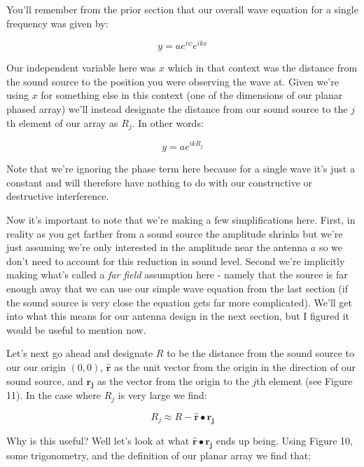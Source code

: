 \documentclass[10pt,a4paper]{article}
\begin{document}
You'll remember from the prior section that our overall wave equation for a single frequency was given by:

\begin{equation}
y = a e^{i\psi}e^{ikx}
\end{equation}

Our independent variable here was $x$ which in that context was the distance from the sound source to the position you were observing the wave at. Given we're using $x$ for something else in this context (one of the dimensions of our planar phased array) we'll instead designate the distance from our sound source to the $j$th element of our array as $R_j$. In other words:


\begin{equation}
y = a e^{ikR_j}
\end{equation}

Note that we're ignoring the phase term here because for a single wave it's just a constant and will therefore have nothing to do with our constructive or destructive interference. 

Now it's important to note that we're making a  few simplifications here. First, in reality as you get farther from a sound source the amplitude shrinks but we're just assuming we're only interested in the amplitude near the antenna $a$ so we don't need to account for this reduction in sound level. Second we're implicitly making what's called a \textit{far field} assumption here - namely that the source is far enough away that we can use our simple wave equation from the last section (if the sound source is very close the equation gets far more complicated). We'll get into what this means for our antenna design in the next section, but I figured it would be useful to mention now. 

Let's next go ahead and designate $R$ to be the distance from the sound source to our our origin $(0,0)$, $\mathbf{\hat{r}}$ as the unit vector from the origin in the direction of our sound source, and $\mathbf{r_j}$ as the vector from the origin to the $j$th element (see Figure 11). In the case where $R_j$ is very large we find:

\begin{equation}
R_j \approx R - \mathbf{\hat{r}}\bullet\mathbf{r_j}
\end{equation}

Why is this useful? Well let's look at what $\mathbf{\hat{r}}\bullet\mathbf{r_j}$ ends up being. Using Figure 10, some trigonometry, and the definition of our planar array we find that:
\end{document}

